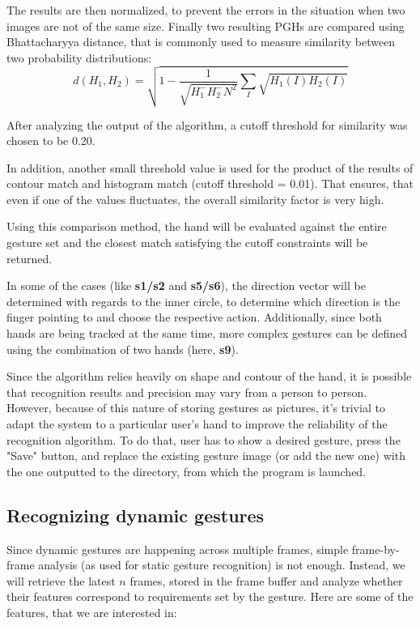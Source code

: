 \documentclass[a4paper,11pt,oneside]{article}
\begin{document}
\begin{itemize}
The results are then normalized, to prevent the errors in the situation when two images are not of the same size. Finally two resulting PGHs are compared using Bhattacharyya distance, that is commonly used to measure similarity between two probability distributions:
\[ d(H_1, H_2) = \sqrt{1- \frac{1}{ \sqrt{H_1^{-} H_2^{-} N^2}}  \sum\limits_{I} \sqrt{H_1(I) H_2(I)}} \] 

After analyzing the output of the algorithm, a cutoff threshold for similarity was chosen to be 0.20.\\

\end{itemize}

In addition, another small threshold value is used for the product of the results of contour match and histogram match (cutoff threshold = 0.01). That ensures, that even if one of the values fluctuates, the overall similarity factor is very high.

Using this comparison method, the hand will be evaluated against the entire gesture set and the closest match satisfying the cutoff constraints will be returned.

In some of the cases (like \textbf{s1/s2} and \textbf{s5/s6}), the direction vector will be determined with regards to the inner circle, to determine which direction is the finger pointing to and choose the respective action. Additionally, since both hands are being tracked at the same time, more complex gestures can be defined using the combination of two hands (here, \textbf{s9}).

Since the algorithm relies heavily on shape and contour of the hand, it is possible that recognition results and precision may vary from a person to person. However, because of this nature of storing gestures as pictures, it's trivial to adapt the system to a particular user's hand to improve the reliability of the recognition algorithm. To do that, user has to show a desired gesture, press the "Save" button, and replace the existing gesture image (or add the new one) with the one outputted to the directory, from which the program is launched. 


\subsection{Recognizing dynamic gestures}
  
Since dynamic gestures are happening across multiple frames, simple frame-by-frame analysis (as used for static gesture recognition) is not enough. Instead, we will retrieve the latest $n$ frames, stored in the frame buffer and analyze whether their features correspond to requirements set by the gesture. Here are some of the features, that we are interested in:
\end{document}

